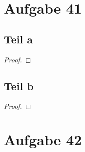 \documentclass[10pt,a4paper]{article}
\begin{document}
\section{Aufgabe 41}

\subsection{Teil a}
\begin{proof}

\end{proof}

\subsection{Teil b}
\begin{proof}

\end{proof}

\section{Aufgabe 42}
\end{document}
